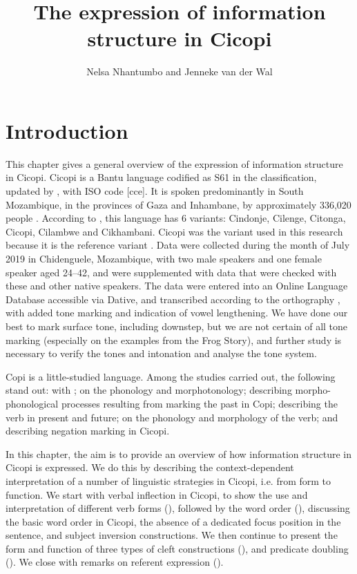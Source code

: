 \documentclass[output=paper]{langscibook}
\author{Nelsa Nhantumbo\orcid{}\affiliation{Universidade Eduardo Mondlane} and Jenneke van der Wal\orcid{}\affiliation{Leiden University} }
\title{The expression of information structure in Cicopi}
\begin{document}
\maketitle 
\label{ch:9}


\section{Introduction}

This chapter gives a general overview of the expression of information structure in Cicopi. Cicopi is a Bantu language codified as S61 in the \citet{Guthrie1948} classification, updated by \citet{Maho2009}, with ISO code [cce]. It is spoken predominantly in South Mozambique, in the provinces of Gaza and Inhambane, by approximately 336,020 people \citep{INE2017}. According to \citet{NgungaFaquir2011}, this language has 6 variants: Cindonje, Cilenge, Citonga, Cicopi, Cilambwe and Cikhambani. Cicopi was the variant used in this research because it is the reference variant \citep[see][]{NgungaFaquir2011}. Data were collected during the month of July 2019 in Chidenguele, Mozambique, with two male speakers and one female speaker aged 24--42, and were supplemented with data that were checked with these and other native speakers. The data were entered into an Online Language Database accessible via Dative, and transcribed according to the orthography \citep{NgungaFaquir2011}, with added tone marking and indication of vowel lengthening. We have done our best to mark surface tone, including downstep, but we are not certain of all tone marking (especially on the examples from the Frog Story), and further study is necessary to verify the tones and intonation and analyse the tone system.

Copi is a little-studied language. Among the studies carried out, the following stand out: \citet{DosSantos1941} with ; \citet{Bailey1976} on the phonology and morphotonology; \citet{Nhantumbo2009} describing morpho-phonological processes resulting from marking the past in Copi; \citet{Nhantumbo2014} describing the verb in present and future; \citet{Nhantumbo2019} on the phonology and morphology of the verb; and \citet{Nhantumbo2019a} describing negation marking in Cicopi.

In this chapter, the aim is to provide an overview of how information structure in Cicopi is expressed. We do this by describing the context-dependent interpretation of a number of linguistic strategies in Cicopi, i.e. from form to function. We start with verbal inflection in Cicopi, to show the use and interpretation of different verb forms (), followed by the word order (), discussing the basic word order in Cicopi, the absence of a dedicated focus position in the sentence, and subject inversion constructions. We then continue to present the form and function of three types of cleft constructions (), and predicate doubling (). We close with remarks on referent expression ().
\end{document}
